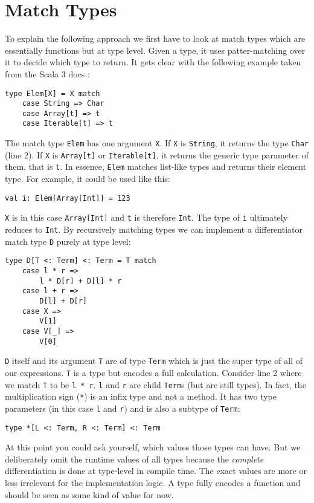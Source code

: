 \section{Match Types} \label{sec:matchTypes}
To explain the following approach we first have to look at match types which are essentially functions but at type level. Given a type, it uses patter-matching over it to decide which type to return. It gets clear with the following example taken from the Scala 3 docs \cite{matchTypesScala3}:
\begin{lstlisting}
type Elem[X] = X match
    case String => Char
    case Array[t] => t
    case Iterable[t] => t
\end{lstlisting}
The match type \lstinline{Elem} has one argument \lstinline{X}. If \lstinline{X} is \lstinline{String}, it returns the type \lstinline{Char} (line 2). If \lstinline{X} is \lstinline{Array[t]} or \lstinline{Iterable[t]}, it returns the generic type parameter of them, that is \lstinline{t}. In essence, \lstinline{Elem} matches list-like types and returns their element type. For example, it could be used like this:
\begin{lstlisting}
val i: Elem[Array[Int]] = 123
\end{lstlisting}
\lstinline{X} is in this case \lstinline{Array[Int]} and \lstinline{t} is therefore \lstinline{Int}. The type of \lstinline{i} ultimately reduces to \lstinline{Int}. By recursively matching types we can implement a differentiator match type \lstinline{D} purely at type level:
\begin{lstlisting}
type D[T <: Term] <: Term = T match
    case l * r => 
        l * D[r] + D[l] * r
    case l + r => 
        D[l] + D[r]
    case X => 
        V[1]
    case V[_] => 
        V[0]
\end{lstlisting}
\lstinline{D} itself and its argument \lstinline{T} are of type \lstinline{Term} which is just the super type of all of our expressions.
\lstinline{T} is a type but encodes a full calculation. Consider line 2 where we match \lstinline{T} to be \lstinline{l * r}. \lstinline{l} and \lstinline{r} are child \lstinline{Term}s (but are still types). In fact, the multiplication sign (\lstinline{*}) is  an infix type and not a method. It has two type parameters (in this case \lstinline{l} and \lstinline{r}) and is also a subtype of \lstinline{Term}:
\begin{lstlisting}
type *[L <: Term, R <: Term] <: Term
\end{lstlisting}
At this point you could ask yourself, which values those types can have. But we deliberately omit the runtime values of all types because the \emph{complete} differentiation is done at type-level in compile time. The exact values are more or less irrelevant for the implementation logic. A type fully encodes a function and should be seen as some kind of value for now.

